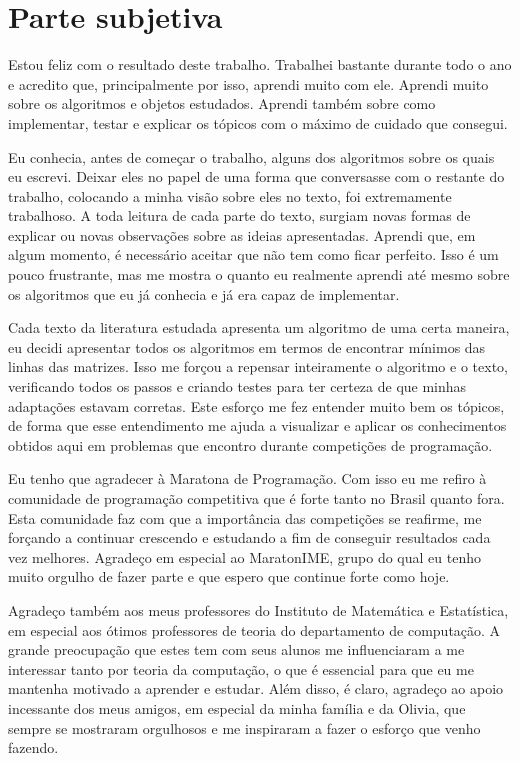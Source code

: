 \chapter{Parte subjetiva}
\label{Subjetiva}

Estou feliz com o resultado deste trabalho. Trabalhei bastante durante todo o ano e acredito que, principalmente por isso, aprendi muito com ele. Aprendi muito sobre os algoritmos e objetos estudados. Aprendi também sobre como implementar, testar e explicar os tópicos com o máximo de cuidado que consegui.

Eu conhecia, antes de começar o trabalho, alguns dos algoritmos sobre os quais eu escrevi. Deixar eles no papel de uma forma que conversasse com o restante do trabalho, colocando a minha visão sobre eles no texto, foi extremamente trabalhoso. A toda leitura de cada parte do texto, surgiam novas formas de explicar ou novas observações sobre as ideias apresentadas. Aprendi que, em algum momento, é necessário aceitar que não tem como ficar perfeito. Isso é um pouco frustrante, mas me mostra o quanto eu realmente aprendi até mesmo sobre os algoritmos que eu já conhecia e já era capaz de implementar.

Cada texto da literatura estudada apresenta um algoritmo de uma certa maneira, eu decidi apresentar todos os algoritmos em termos de encontrar mínimos das linhas das matrizes. Isso me forçou a repensar inteiramente o algoritmo e o texto, verificando todos os passos e criando testes para ter certeza de que minhas adaptações estavam corretas. Este esforço me fez entender muito bem os tópicos, de forma que esse entendimento me ajuda a visualizar e aplicar os conhecimentos obtidos aqui em problemas que encontro durante competições de programação.

Eu tenho que agradecer à Maratona de Programação. Com isso eu me refiro à comunidade de programação competitiva que é forte tanto no Brasil quanto fora. Esta comunidade faz com que a importância das competições se reafirme, me forçando a continuar crescendo e estudando a fim de conseguir resultados cada vez melhores. Agradeço em especial ao MaratonIME, grupo do qual eu tenho muito orgulho de fazer parte e que espero que continue forte como hoje.

Agradeço também aos meus professores do Instituto de Matemática e Estatística, em especial aos ótimos professores de teoria do departamento de computação. A grande preocupação que estes tem com seus alunos me influenciaram a me interessar tanto por teoria da computação, o que é essencial para que eu me mantenha motivado a aprender e estudar. Além disso, é claro, agradeço ao apoio incessante dos meus amigos, em especial da minha família e da Olivia, que sempre se mostraram orgulhosos e me inspiraram a fazer o esforço que venho fazendo.
